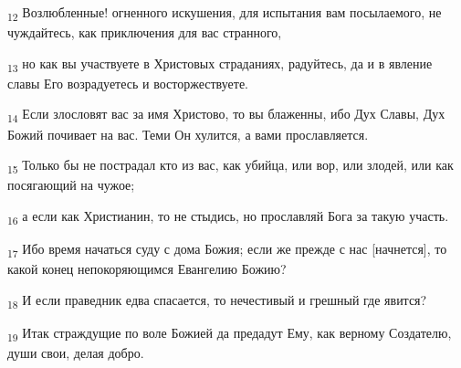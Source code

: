 \begin{tcolorbox}
\textsubscript{12} Возлюбленные! огненного искушения, для испытания вам посылаемого, не чуждайтесь, как приключения для вас странного,
\end{tcolorbox}
\begin{tcolorbox}
\textsubscript{13} но как вы участвуете в Христовых страданиях, радуйтесь, да и в явление славы Его возрадуетесь и восторжествуете.
\end{tcolorbox}
\begin{tcolorbox}
\textsubscript{14} Если злословят вас за имя Христово, то вы блаженны, ибо Дух Славы, Дух Божий почивает на вас. Теми Он хулится, а вами прославляется.
\end{tcolorbox}
\begin{tcolorbox}
\textsubscript{15} Только бы не пострадал кто из вас, как убийца, или вор, или злодей, или как посягающий на чужое;
\end{tcolorbox}
\begin{tcolorbox}
\textsubscript{16} а если как Христианин, то не стыдись, но прославляй Бога за такую участь.
\end{tcolorbox}
\begin{tcolorbox}
\textsubscript{17} Ибо время начаться суду с дома Божия; если же прежде с нас [начнется], то какой конец непокоряющимся Евангелию Божию?
\end{tcolorbox}
\begin{tcolorbox}
\textsubscript{18} И если праведник едва спасается, то нечестивый и грешный где явится?
\end{tcolorbox}
\begin{tcolorbox}
\textsubscript{19} Итак страждущие по воле Божией да предадут Ему, как верному Создателю, души свои, делая добро.
\end{tcolorbox}
